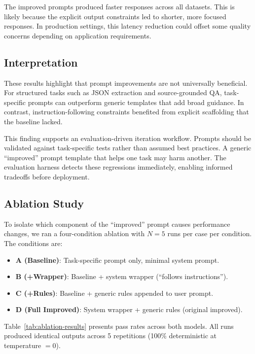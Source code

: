 The improved prompts produced faster responses across all datasets. This is likely because the explicit output constraints led to shorter, more focused responses. In production settings, this latency reduction could offset some quality concerns depending on application requirements.

\subsection{Interpretation}

These results highlight that prompt improvements are not universally beneficial. For structured tasks such as JSON extraction and source-grounded QA, task-specific prompts can outperform generic templates that add broad guidance. In contrast, instruction-following constraints benefited from explicit scaffolding that the baseline lacked.

This finding supports an evaluation-driven iteration workflow. Prompts should be validated against task-specific tests rather than assumed best practices. A generic ``improved'' prompt template that helps one task may harm another. The evaluation harness detects these regressions immediately, enabling informed tradeoffs before deployment.

\subsection{Ablation Study}

To isolate which component of the ``improved'' prompt causes performance changes, we ran a four-condition ablation with $N=5$ runs per case per condition. The conditions are:
\begin{itemize}[itemsep=2pt]
    \item \textbf{A (Baseline)}: Task-specific prompt only, minimal system prompt.
    \item \textbf{B (+Wrapper)}: Baseline + system wrapper (``follows instructions'').
    \item \textbf{C (+Rules)}: Baseline + generic rules appended to user prompt.
    \item \textbf{D (Full Improved)}: System wrapper + generic rules (original improved).
\end{itemize}

Table~\ref{tab:ablation-results} presents pass rates across both models. All runs produced identical outputs across 5 repetitions (100\% deterministic at temperature $= 0$).

